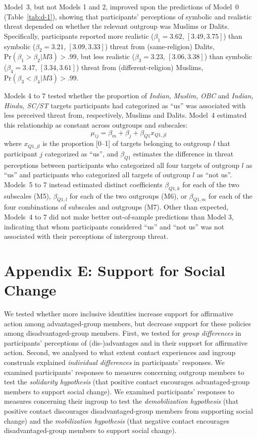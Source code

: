 \documentclass[12pt, a4paper]{article}
\begin{document}
Model~3, but not Models 1 and 2, improved upon the predictions of Model~0 (Table~\ref{tab:d-1}), showing that participants' perceptions of symbolic and realistic threat depended on whether the relevant outgroup was Muslims or Dalits. Specifically, participants reported more realistic ($ \beta_1 = 3.62$, $[3.49, 3.75]$) than symbolic ($\beta_2 = 3.21$, $[3.09, 3.33]$) threat from (same-religion) Dalits, $\text{Pr} (\beta_1 > \beta_2|M3) > .99$, but less realistic ($\beta_3 = 3.23$, $[3.06, 3.38]$) than symbolic ($\beta_4 = 3.47$, $[3.34, 3.61]$) threat from (different-religion) Muslims, $\text{Pr} (\beta_3 < \beta_4| M3) > .99$.

Models 4 to 7 tested whether the proportion of \emph{Indian, Muslim, OBC} and \emph{Indian, Hindu, SC/ST} targets participants had categorized as ``us'' was associated with less perceived threat from, respectively, Muslims and Dalits. Model~4 estimated this relationship as constant across outgroups and subscales: $$ \mu_{ij} = \beta_m + \beta_{j} + \beta_{Q1}x_{Q1,jl} $$ where $x_{Q1,jl}$ is the proportion [0--1] of targets belonging to outgroup $l$ that participant $j$ categorized as ``us'', and $\beta_{Q1}$ estimates the difference in threat perceptions between participants who categorized all four targets of outgroup $l$ as ``us'' and participants who categorized all targets of outgroup $l$ as ``not us''. Models~5 to 7 instead estimated distinct coefficients $\beta_{Q1,k}$ for each of the two subscales (M5), $\beta_{Q1,l}$ for each of the two outgroups (M6), or $\beta_{Q1,m}$ for each of the four combinations of subscales and outgroups (M7). Other than expected, Models~4 to 7 did not make better out-of-sample predictions than Model 3, indicating that whom participants considered ``us'' and ``not us'' was not associated with their perceptions of intergroup threat.

\section{Appendix E: Support for Social Change}

We tested whether more inclusive identities increase support for affirmative action among advantaged-group members, but decrease support for these policies among disadvantaged-group members. First, we tested for \emph{group differences} in participants' perceptions of (dis-)advantages and in their support for affirmative action. Second, we analysed to what extent contact experiences and ingroup construals explained \emph{individual differences} in participants' responses. We examined participants' responses to measures concerning outgroup members to test the \emph{solidarity hypothesis} (that positive contact encourages advantaged-group members to support social change). We examined participants' responses to measures concerning their ingroup to test the \emph{demobilization hypothesis} (that positive contact discourages disadvantaged-group members from supporting social change) and the \emph{mobilization hypothesis} (that negative contact encourages disadvantaged-group members to support social change).
\end{document}
